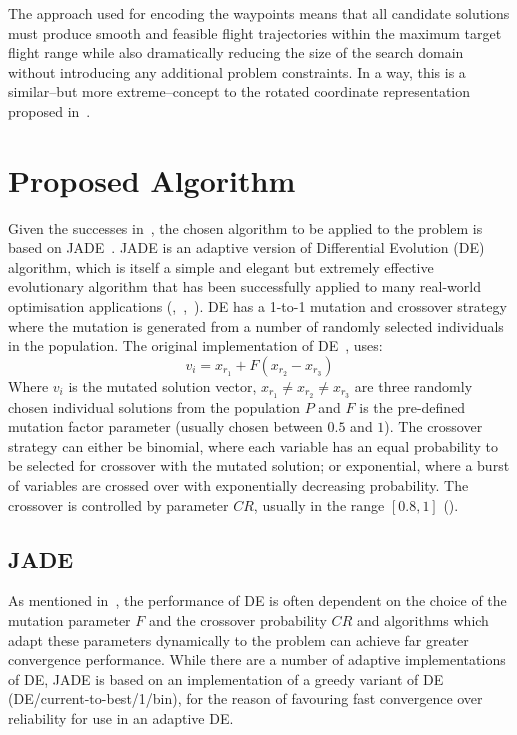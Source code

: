 \documentclass[10pt,a4paper, oneside, conference]{IEEEtran}
\begin{document}
	The approach used for encoding the waypoints means that all candidate solutions must produce smooth and feasible flight trajectories within the maximum target flight range while also dramatically reducing the size of the search domain without introducing any additional problem constraints.
	In a way, this is a similar--but more extreme--concept to the rotated coordinate representation proposed in~\cite{Yang2014}.
		
	\section{Proposed Algorithm}
	\label{section:algorithm}
	
	Given the successes in~\cite{Yang2015}, the chosen algorithm to be applied to the problem is based on JADE~\cite{Zhang2009}.
	JADE is an adaptive version of Differential Evolution (DE) algorithm, which is itself a simple and elegant but extremely effective evolutionary algorithm that has been successfully applied to many real-world optimisation applications (\cite{storn1997differential},~\cite{mezura2006comparative},~\cite{Das2011}).
	DE has a 1-to-1 mutation and crossover strategy where the mutation is generated from a number of randomly selected individuals in the population. 
	The original implementation of DE~\cite{storn1997differential}, uses:
	\begin{equation}
	\label{equation:originalDEMutation}
	v_i=x_{r_1}+F(x_{r_2}-x_{r_3})
	\end{equation}
	Where $v_i$ is the mutated solution vector, $x_{r_1} \neq x_{r_2} \neq x_{r_3}$ are three randomly chosen individual solutions from the population $P$ and $F$ is the pre-defined mutation factor parameter (usually chosen between $0.5$ and $1$).
	The crossover strategy can either be binomial, where each variable has an equal probability to be selected for crossover with the mutated solution; or exponential, where a burst of variables are crossed over with exponentially decreasing probability.
	The crossover is controlled by parameter $CR$, usually in the range $[0.8,1]$ (\cite{Liu2005}).
	
	\subsection{JADE}
	
	As mentioned in~\cite{Zhang2009}, the performance of DE is often dependent on the choice of the mutation parameter $F$ and the crossover probability $CR$ and algorithms which adapt these parameters dynamically to the problem can achieve far greater convergence performance.
	While there are a number of adaptive implementations of DE, JADE is based on an implementation of a greedy variant of DE (DE/current-to-best/1/bin), for the reason of favouring fast convergence over reliability for use in an adaptive DE.
	
\end{document}
